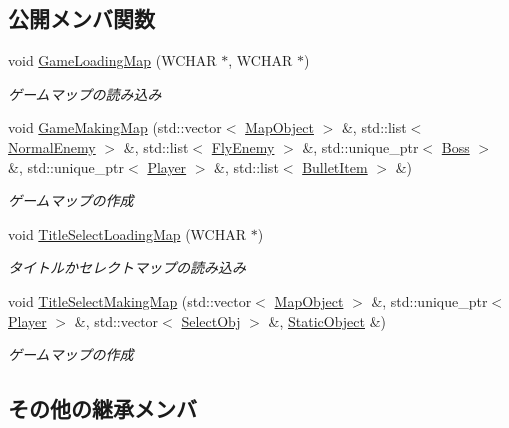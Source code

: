 \subsection*{公開メンバ関数}
\begin{DoxyCompactItemize}
\item 
void \mbox{\hyperlink{class_load_map_a534a2ac8151a7549b1fed723759ab2d0}{Game\+Loading\+Map}} (W\+C\+H\+AR $\ast$, W\+C\+H\+AR $\ast$)
\begin{DoxyCompactList}\small\item\em ゲームマップの読み込み \end{DoxyCompactList}\item 
void \mbox{\hyperlink{class_load_map_a44d4c9299837322a7eedbb298b6dbda9}{Game\+Making\+Map}} (std\+::vector$<$ \mbox{\hyperlink{class_map_object}{Map\+Object}} $>$ \&, std\+::list$<$ \mbox{\hyperlink{class_normal_enemy}{Normal\+Enemy}} $>$ \&, std\+::list$<$ \mbox{\hyperlink{class_fly_enemy}{Fly\+Enemy}} $>$ \&, std\+::unique\+\_\+ptr$<$ \mbox{\hyperlink{class_boss}{Boss}} $>$ \&, std\+::unique\+\_\+ptr$<$ \mbox{\hyperlink{class_player}{Player}} $>$ \&, std\+::list$<$ \mbox{\hyperlink{class_bullet_item}{Bullet\+Item}} $>$ \&)
\begin{DoxyCompactList}\small\item\em ゲームマップの作成 \end{DoxyCompactList}\item 
void \mbox{\hyperlink{class_load_map_a9cfbf3d52bcaf5384d882c1cf591bf43}{Title\+Select\+Loading\+Map}} (W\+C\+H\+AR $\ast$)
\begin{DoxyCompactList}\small\item\em タイトルかセレクトマップの読み込み \end{DoxyCompactList}\item 
void \mbox{\hyperlink{class_load_map_a69d69c3ac701f152395a18719c16c881}{Title\+Select\+Making\+Map}} (std\+::vector$<$ \mbox{\hyperlink{class_map_object}{Map\+Object}} $>$ \&, std\+::unique\+\_\+ptr$<$ \mbox{\hyperlink{class_player}{Player}} $>$ \&, std\+::vector$<$ \mbox{\hyperlink{class_select_obj}{Select\+Obj}} $>$ \&, \mbox{\hyperlink{class_static_object}{Static\+Object}} \&)
\begin{DoxyCompactList}\small\item\em ゲームマップの作成 \end{DoxyCompactList}\end{DoxyCompactItemize}
\subsection*{その他の継承メンバ}


